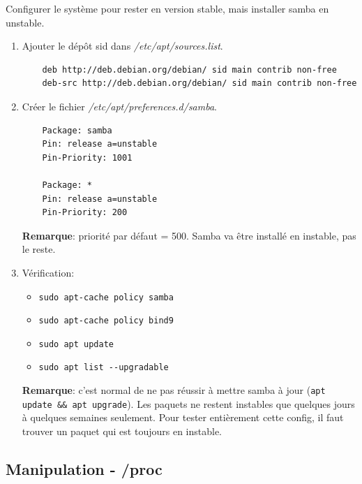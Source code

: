 \documentclass[a4paper]{article}
\begin{document}
Configurer le système pour rester en version stable, mais installer samba en unstable.
\begin{example}
    \begin{enumerate}
        \item Ajouter le dépôt sid dans \textit{/etc/apt/sources.list}.
        \begin{verbatim}
    deb http://deb.debian.org/debian/ sid main contrib non-free
    deb-src http://deb.debian.org/debian/ sid main contrib non-free
        \end{verbatim}
        \item Créer le fichier \textit{/etc/apt/preferences.d/samba}.
        \begin{verbatim}
    Package: samba
    Pin: release a=unstable
    Pin-Priority: 1001

    Package: *
    Pin: release a=unstable
    Pin-Priority: 200
        \end{verbatim}
        \textbf{Remarque}: priorité par défaut = 500. Samba va être installé en instable, pas le reste.
        \item Vérification:
        \begin{itemize}
            \item \texttt{sudo apt-cache policy samba}
            \item \texttt{sudo apt-cache policy bind9}
            \item \texttt{sudo apt update}
            \item \texttt{sudo apt list -{}-upgradable}
        \end{itemize}
        \textbf{Remarque}: c'est normal de ne pas réussir à mettre samba à jour (\texttt{apt update \&\& apt upgrade}). Les paquets ne restent instables que quelques jours à quelques semaines seulement. Pour tester entièrement cette config, il faut trouver un paquet qui est toujours en instable.
    \end{enumerate}
\end{example}










\subsection{Manipulation - /proc}
\end{document}
